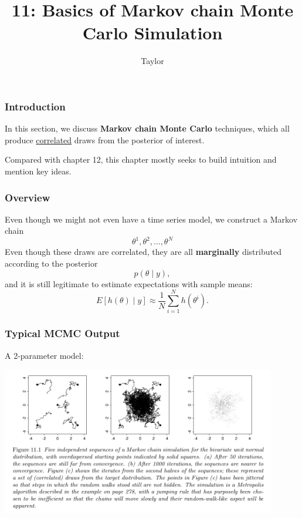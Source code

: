\documentclass{beamer}
\title["11"]{11: Basics of Markov chain Monte Carlo Simulation}
\author{Taylor}
\institute[UVA] 
{
University of Virginia \\
\medskip
\textit{} 
}
\date{}
\begin{document}

\begin{frame}
\titlepage 
\end{frame}

\begin{frame}
\frametitle{Introduction}

In this section, we discuss {\bf Markov chain Monte Carlo} techniques, which all produce \underline{correlated} draws from the posterior of interest.
\newline

Compared with chapter 12, this chapter mostly seeks to build intuition and mention key ideas.


\end{frame}

\begin{frame}
\frametitle{Overview}

Even though we might not even have a time series model, we construct a Markov chain 
$$
\theta^1, \theta^2, \ldots, \theta^N
$$
Even though these draws are correlated, they are all {\bf marginally} distributed according to the posterior 
$$
p(\theta \mid y),
$$
and it is still legitimate to estimate expectations with sample means:
$$
E[h(\theta) \mid y] \approx  \frac{1}{N}\sum_{i=1}^N h(\theta^i).
$$
\end{frame}

\begin{frame}
\frametitle{Typical MCMC Output}

A 2-parameter model:
\begin{center}
\includegraphics[width=120mm]{fig11.png}
\end{center}

\end{frame}
\end{document}
